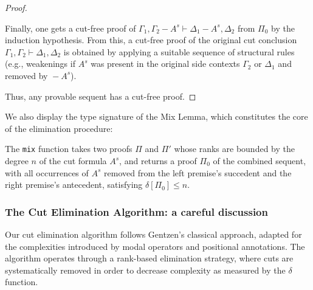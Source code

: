\documentclass{article}
\newcommand{\seq}[2]{{#1} \vdash{} {#2}}
\newcommand{\pf}[2]{{#1}^{#2}} %
\newcommand{\cana}[1]{#1\!-\!\pf{A}{s}}
\theoremstyle{definition}
\begin{document}
\begin{proof}
\begin{enumerate}
        Finally, one gets a cut-free proof of
        $\seq{\Gamma_1, \cana{\Gamma_2}}{\cana{\Delta_1}, \Delta_2}$ from $\Pi_0$ by the induction hypothesis.
        From this, a cut-free proof of the original cut conclusion $\seq{\Gamma_1, \Gamma_2}{\Delta_1, \Delta_2}$
        is obtained by applying a suitable sequence of structural rules (e.g., weakenings if $\pf{A}{s}$ was present in the original side contexts $\Gamma_2$ or $\Delta_1$ and removed by $\cana{}$).
\end{enumerate}
Thus, any provable sequent has a cut-free proof.

\end{proof}

We also display the type signature of the Mix Lemma, which constitutes the core of the elimination procedure:


\noindent
The \texttt{mix} function takes two proofs $\Pi$ and $\Pi'$ whose ranks are bounded by the degree $n$ of the cut formula $A^{s}$, and returns a proof $\Pi_0$ of the combined sequent, with all occurrences of $A^{s}$ removed from the left premise's succedent and the right premise's antecedent, satisfying $\delta[\Pi_0] \leq n$.

\subsubsection{The Cut Elimination Algorithm: a careful discussion}\label{ssec:implementation}

Our cut elimination algorithm follows Gentzen's classical approach, adapted for the complexities introduced by modal operators and positional annotations. The algorithm operates through a rank-based elimination strategy, where cuts are systematically removed in order to decrease complexity as measured by the $\delta$ function.
\end{document}
